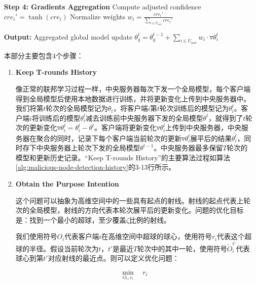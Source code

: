 \documentclass[lettersize,journal]{IEEEtran}
\begin{document}
\begin{algorithm}
\begin{algorithmic}[1]
\State \textbf{Step 4: Gradients Aggregation}
        \State Compute adjusted confidence $cre_i' = \tanh(cre_i)$
        \State Normalize weights $w_i = \frac{cre_i'}{\sum_{i \in U_{nor}} cre_i'}$
\EndFor

\State \textbf{Output:} Aggregated global model update $\theta_g^t = \theta_g^{t-1} + \sum_{i \in U_{nor}} w_i \cdot \triangledown \theta_i^t$
\end{algorithmic}
\end{algorithm}

本部分主要包含4个步骤：

\begin{enumerate}

\item \textbf{Keep T-rounds History}

像正常的联邦学习过程一样，中央服务器每次下发一个全局模型，每个客户端得到全局模型后使用本地数据进行训练，并将更新变化上传到中央服务器中。我们将第$t$轮次的全局模型记为$\theta_t$，将客户端$i$第$t$轮次训练后的模型记为$\theta^t_i$。客户端$i$将训练后的模型$\theta^t_{i}$减去训练前中央服务器下发的全局模型$\theta^t$，就得到了$t$轮次的更新变化$\triangledown \theta^t_{i}=\theta^t_{i}-\theta^t$。客户端将更新变化$\triangledown \theta^t_{i}$上传到中央服务器，中央服务器在聚合的同时，记录下每个客户端当前轮次的更新$\triangledown \theta^t_{i}$展平后的结果$\bar{\theta_i^t}$，同时存下中央服务器上轮次下发的全局模型$\theta^{t-1}$。中央服务器最多保留$T$轮次的模型和更新历史记录。“Keep T-rounds History”的主要算法过程如算法\ref{alg:malicious-node-detection-history}的3-13行所示。%

\item \textbf{Obtain the Purpose Intention}

这个问题可以抽象为高维空间中的一些具有起点的射线。射线的起点代表上轮次的全局模型，射线的方向代表本轮次展平后的更新变化。问题的优化目标是：找到一个最小的超球，至少覆盖$\zeta$比例的射线。

我们使用符号$O_i$代表客户端$i$在高维空间中超球的球心，使用符号$r_i$代表这个超球的半径。假设当前轮次为$t$，$t'$是最近$T$轮次中的其中一轮，使用符号$\tilde O_i^{t'}$代表球心到第$t'$对应射线的最近点。则可以定义优化问题：

\begin{equation}
    \min_{O_i, r_i} \quad r_i
\end{equation}


\end{enumerate}
\end{document}
